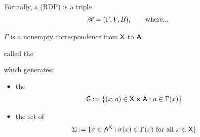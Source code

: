 \documentclass[dvipsnames]{beamer}
\begin{document}
\begin{frame}

    Formally, a  (RDP) is a triple
    \begin{equation*}
     \mathscr R = (\Gamma, V, B),
     \qquad \text{where...}
    \end{equation*}
   
            \vspace{0.5em}
            \vspace{0.5em}

     $\Gamma$ is a nonempty correspondence from $\mathsf X$ to $\mathsf A$
    \begin{center}
        called the 
    \end{center}

    which generates:
    \begin{itemize}
        \item the 
            \begin{equation*}
                \mathsf G := \{ (x, a) \in \mathsf X \times \mathsf A : a \in \Gamma(x) \}
            \end{equation*}
        \item the set of 
            \begin{equation*}
                \Sigma := 
                    \{ \sigma \in \mathsf A^\mathsf X : \sigma(x) \in \Gamma(x) \text{ for all } x \in \mathsf X \}
            \end{equation*}
    \end{itemize}

\end{frame}
\end{document}
